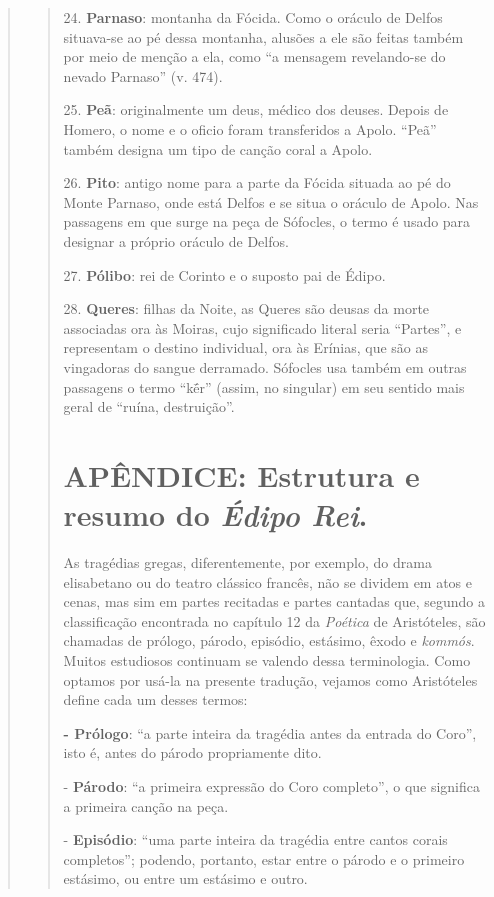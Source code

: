 \begin{verse}
\begin{verse}
24. \textbf{Parnaso}: montanha da Fócida. Como o oráculo de Delfos
situava-se ao pé dessa montanha, alusões a ele são feitas também por
meio de menção a ela, como ``a mensagem revelando-se do nevado Parnaso''
(v. 474).

25. \textbf{Peã}: originalmente um deus, médico dos deuses. Depois de
Homero, o nome e o oficio foram transferidos a Apolo. ``Peã'' também
designa um tipo de canção coral a Apolo.

26. \textbf{Pito}: antigo nome para a parte da Fócida situada ao pé do
Monte Parnaso, onde está Delfos e se situa o oráculo de Apolo. Nas
passagens em que surge na peça de Sófocles, o termo é usado para
designar a próprio oráculo de Delfos.

27. \textbf{Pólibo}: rei de Corinto e o suposto pai de Édipo.

28. \textbf{Queres}: filhas da Noite, as Queres são deusas da morte
associadas ora às Moiras, cujo significado literal seria ``Partes'', e
representam o destino individual, ora às Erínias, que são as vingadoras
do sangue derramado. Sófocles usa também em outras passagens o termo
``kḗr'' (assim, no singular) em seu sentido mais geral de ``ruína,
destruição''.

\chapter{APÊNDICE: Estrutura e resumo do \emph{Édipo Rei}. }

As tragédias gregas, diferentemente, por exemplo, do drama elisabetano
ou do teatro clássico francês, não se dividem em atos e cenas, mas sim
em partes recitadas e partes cantadas que, segundo a classificação
encontrada no capítulo 12 da \emph{Poética} de Aristóteles, são chamadas
de prólogo, párodo, episódio, estásimo, êxodo e \emph{kommós}. Muitos
estudiosos continuam se valendo dessa terminologia. Como optamos por
usá-la na presente tradução, vejamos como Aristóteles define cada um
desses termos:

\textbf{- Prólogo}: ``a parte inteira da tragédia antes da entrada do
Coro'', isto é, antes do párodo propriamente dito.

- \textbf{Párodo}: ``a primeira expressão do Coro completo'', o que
significa a primeira canção na peça.

- \textbf{Episódio}: ``uma parte inteira da tragédia entre cantos corais
completos''; podendo, portanto, estar entre o párodo e o primeiro
estásimo, ou entre um estásimo e outro.


\end{verse}
\end{verse}
